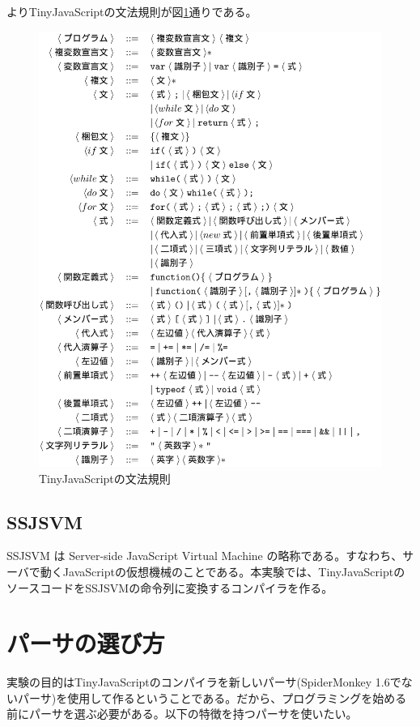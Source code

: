 \documentclass[12pt]{article}
\begin{document}
\cite{jscompiler}よりTinyJavaScriptの文法規則が図\ref{grammarFig}通りである。
\begin{figure}
\centering
\includegraphics[scale=0.41]{grammar.eps}
\caption{TinyJavaScriptの文法規則}
\label{grammarFig}
\end{figure}
\FloatBarrier

\subsection{SSJSVM}
SSJSVM は Server-side JavaScript Virtual Machine の略称である。すなわち、サーバで動くJavaScriptの仮想機械のことである。本実験では、TinyJavaScriptのソースコードをSSJSVMの命令列に変換するコンパイラを作る。

\section{パーサの選び方}
実験の目的はTinyJavaScriptのコンパイラを新しいパーサ(SpiderMonkey 1.6でないパーサ)を使用して作るということである。だから、プログラミングを始める前にパーサを選ぶ必要がある。以下の特徴を持つパーサを使いたい。
\end{document}
